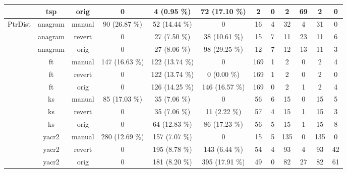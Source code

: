 \begin{tabular}{||c c c c c c c c c c c c||}
\hline
\rowcolor{white}
 & tsp & orig & {\color{gray} 0} & 4 (0.95 \%) & 72 (17.10 \%) & 2 & 0 & 2 & 69 & 2 & 0 \\
\hline
\hline
\rowcolor[rgb]{0.8,0.8,0.8}
PtrDist & anagram & manual & 90 (26.87 \%) & 52 (14.44 \%) & {\color{gray} 0} & 16 & 4 & 32 & 4 & 31 & 0 \\
\hline
\rowcolor[rgb]{0.8,0.8,0.8}
 & anagram & revert & {\color{gray} 0} & 27 (7.50 \%) & 38 (10.61 \%) & 15 & 7 & 11 & 23 & 11 & 6 \\
\hline
\rowcolor[rgb]{0.8,0.8,0.8}
 & anagram & orig & {\color{gray} 0} & 27 (8.06 \%) & 98 (29.25 \%) & 12 & 7 & 12 & 13 & 11 & 3 \\
\hline
\rowcolor{white}
 & ft & manual & 147 (16.63 \%) & 122 (13.74 \%) & {\color{gray} 0} & 169 & 1 & 2 & 0 & 2 & 4 \\
\hline
\rowcolor{white}
 & ft & revert & {\color{gray} 0} & 122 (13.74 \%) & 0 (0.00 \%) & 169 & 1 & 2 & 0 & 2 & 0 \\
\hline
\rowcolor{white}
 & ft & orig & {\color{gray} 0} & 126 (14.25 \%) & 146 (16.57 \%) & 169 & 0 & 2 & 1 & 2 & 4 \\
\hline
\rowcolor[rgb]{0.8,0.8,0.8}
 & ks & manual & 85 (17.03 \%) & 35 (7.06 \%) & {\color{gray} 0} & 56 & 6 & 15 & 0 & 15 & 5 \\
\hline
\rowcolor[rgb]{0.8,0.8,0.8}
 & ks & revert & {\color{gray} 0} & 35 (7.06 \%) & 11 (2.22 \%) & 57 & 4 & 15 & 1 & 15 & 3 \\
\hline
\rowcolor[rgb]{0.8,0.8,0.8}
 & ks & orig & {\color{gray} 0} & 64 (12.83 \%) & 86 (17.23 \%) & 56 & 5 & 15 & 1 & 15 & 8 \\
\hline
\rowcolor{white}
 & yacr2 & manual & 280 (12.69 \%) & 157 (7.07 \%) & {\color{gray} 0} & 15 & 5 & 135 & 0 & 135 & 0 \\
\hline
\rowcolor{white}
 & yacr2 & revert & {\color{gray} 0} & 195 (8.78 \%) & 143 (6.44 \%) & 54 & 4 & 93 & 4 & 93 & 42 \\
\hline
\rowcolor{white}
 & yacr2 & orig & {\color{gray} 0} & 181 (8.20 \%) & 395 (17.91 \%) & 49 & 0 & 82 & 27 & 82 & 61 \\
\hline
\end{tabular}
